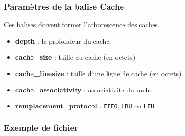 \subsubsection{Paramètres de la balise Cache}
Ces balises doivent former l'arborescence des caches.

\begin{itemize}
  \item \textbf{depth} : la profondeur du cache.
  \item \textbf{cache\_size} : taille du cache (en octets)
  \item \textbf{cache\_linesize} : taille d'une ligne de cache (en octets)
  \item \textbf{cache\_associativity} : associativité du cache
  \item \textbf{remplacement\_protocol} : \verb?FIFO?, \verb?LRU? ou \verb?LFU?
\end{itemize}

\subsubsection{Exemple de fichier}

